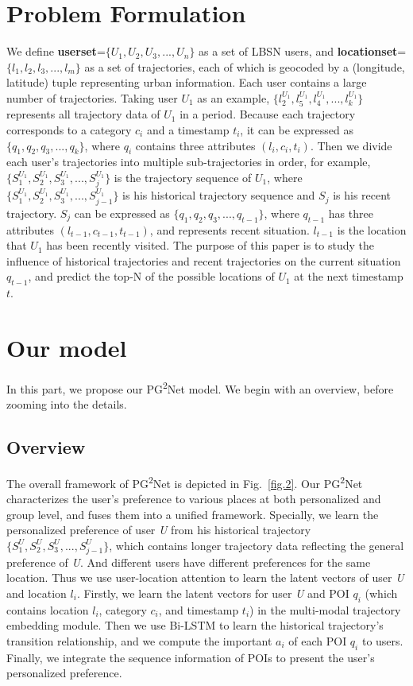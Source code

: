 \documentclass[10pt,journal,compsoc]{IEEEtran}
\begin{document}
\section{Problem Formulation}
\justifying  
We define \textbf{userset}=$\{U_1,U_2,U_3,...,U_n\}$ as a set of LBSN users, and \textbf{locationset}=$\{l_1,l_2,l_3,...,l_m\}$ as a set of trajectories, each of which is geocoded by a (longitude, latitude) tuple representing urban information. Each user contains a large number of trajectories. Taking user $U_1$ as an example, $\{l_2^{U_1},l_5^{U_1},l_4^{U_1},...,l_k^{U_1}\}$ represents all trajectory data of $U_1$ in a period. Because each trajectory corresponds to a category $c_i$ and a timestamp $t_i$, it can be expressed as $\{q_1,q_2,q_3,...,q_k\}$, where $q_i$ contains three attributes $(l_i,c_i,t_i)$. Then we divide each user's trajectories into multiple sub-trajectories in order, for example, $\{S_1^{U_1},S_2^{U_1},S_3^{U_1},...,S_j^{U_1}\}$ is the trajectory sequence of ${U_1}$, where $\{S_1^{U_1},S_2^{U_1},S_3^{U_1},...,S_{j-1}^{U_1}\}$ is his historical trajectory sequence and $S_j$ is his recent trajectory. $S_j$ can be expressed as $\{q_1,q_2,q_3,...,q_{t-1}\}$, where $q_{t-1}$ has three attributes $(l_{t-1},c_{t-1},t_{t-1})$, and represents recent situation. $l_{t-1}$ is the location that $U_1$ has been recently visited. The purpose of this paper is to study the influence of historical trajectories and recent trajectories on the current situation $q_{t-1}$, and predict the top-N of the possible locations of $U_1$ at the next timestamp $t$.
\section{Our model}
In this part, we propose our PG\textsuperscript{2}Net model. We begin with an overview, before zooming into the details.


\subsection{Overview}
The overall framework of PG\textsuperscript{2}Net is depicted in Fig.~\ref{fig.2}. Our PG\textsuperscript{2}Net characterizes the user’s preference to various places at both personalized and group level, and fuses them into a unified framework. Specially, we learn the personalized preference of user \textit{U} from his historical trajectory $\{S_1^{U},S_2^{U},S_3^{U},...,S_{j-1}^{U}\}$, which contains longer trajectory data reflecting the general preference of \textit{U}. And different users have different preferences for the same location. Thus we use user-location attention to learn the latent vectors of user \textit{U} and location $l_i$. Firstly, we learn the latent vectors for user \textit{U} and  POI $q_i$ (which contains location $l_i$, category $c_i$, and timestamp $t_i$) in the multi-modal trajectory embedding module. Then we use Bi-LSTM to learn the historical trajectory’s transition relationship, and we compute the important $a_i$ of each POI $q_i$ to users. Finally, we integrate the sequence information of POIs to present the user’s personalized preference.
\end{document}
